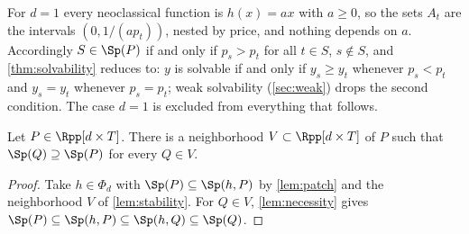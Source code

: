 \begin{remark}\label{rem:d1}
For $d=1$ every neoclassical function is $h(x)=ax$ with $a\ge0$, so the sets $A_t$ are the intervals $(0,1/(ap_t))$, nested by price, and nothing depends on $a$. Accordingly $S\in\Sp(P)$ if and only if $p_s>p_t$ for all $t\in S$, $s\notin S$, and \cref{thm:solvability} reduces to: $y$ is solvable if and only if $y_s\ge y_t$ whenever $p_s<p_t$ and $y_s=y_t$ whenever $p_s=p_t$; weak solvability (\cref{sec:weak}) drops the second condition. The case $d=1$ is excluded from everything that follows.
\end{remark}

\begin{corollary}[openness]\label{lem:open}
Let $P\in\Rpp[d\times T]$. There is a neighborhood $V\subset\Rpp[d\times T]$ of $P$ such that $\Sp(Q)\supseteq\Sp(P)$ for every $Q\in V$.
\end{corollary}

\begin{proof}
Take $h\in\Phi_d$ with $\Sp(P)\subseteq\Sp(h,P)$ by \cref{lem:patch} and the neighborhood $V$ of \cref{lem:stability}. For $Q\in V$, \cref{lem:necessity} gives $\Sp(P)\subseteq\Sp(h,P)\subseteq\Sp(h,Q)\subseteq\Sp(Q)$.
\end{proof}


